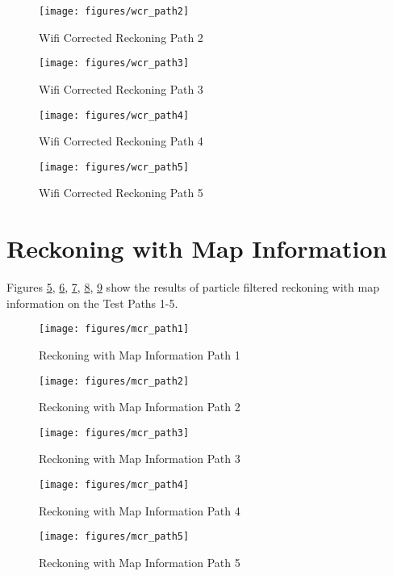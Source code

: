 \begin{figure}
    \centering
    \texttt{[image: figures/wcr\_path2]}
    \caption{Wifi Corrected Reckoning Path 2\label{fig:wcr_path2}}
\end{figure}

\begin{figure}
    \centering
    \texttt{[image: figures/wcr\_path3]}
    \caption{Wifi Corrected Reckoning Path 3\label{fig:wcr_path3}}
\end{figure}

\begin{figure}
    \centering
    \texttt{[image: figures/wcr\_path4]}
    \caption{Wifi Corrected Reckoning Path 4\label{fig:wcr_path4}}
\end{figure}

\begin{figure}
    \centering
    \texttt{[image: figures/wcr\_path5]}
    \caption{Wifi Corrected Reckoning Path 5\label{fig:wcr_path5}}
\end{figure}


\section{Reckoning with Map Information}

Figures \ref{fig:mcr_path1}, \ref{fig:mcr_path2}, \ref{fig:mcr_path3}, \ref{fig:mcr_path4}, \ref{fig:mcr_path5}
show the results of particle filtered reckoning with map information on the Test Paths 1-5.


\begin{figure}
    \centering
    \texttt{[image: figures/mcr\_path1]}
    \caption{Reckoning with Map Information Path 1\label{fig:mcr_path1}}
\end{figure}

\begin{figure}
    \centering
    \texttt{[image: figures/mcr\_path2]}
    \caption{Reckoning with Map Information Path 2\label{fig:mcr_path2}}
\end{figure}

\begin{figure}
    \centering
    \texttt{[image: figures/mcr\_path3]}
    \caption{Reckoning with Map Information Path 3\label{fig:mcr_path3}}
\end{figure}

\begin{figure}
    \centering
    \texttt{[image: figures/mcr\_path4]}
    \caption{Reckoning with Map Information Path 4\label{fig:mcr_path4}}
\end{figure}

\begin{figure}
    \centering
    \texttt{[image: figures/mcr\_path5]}
    \caption{Reckoning with Map Information Path 5\label{fig:mcr_path5}}
\end{figure}

